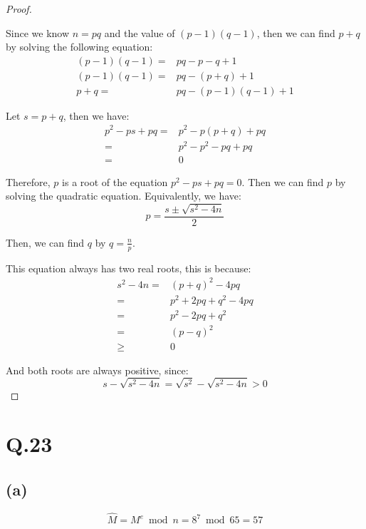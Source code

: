 \documentclass[a4paper,12pt]{article}
\begin{document}
\begin{proof}
$ $

Since we know $n = pq$ and the value of $(p-1)(q-1)$, then we can find $p+q$ by solving the following equation:
\begin{align*}
	(p-1)(q-1) =& pq - p - q + 1 \\
	(p-1)(q-1) =& pq - (p + q) + 1 \\
	p + q =& pq - (p-1)(q-1) + 1 
\end{align*}

Let $s = p + q$, then we have:
\begin{align*}
	p^2 -ps + pq =& p^2 - p(p+q) + pq \\
	=& p^2 -p^2 - pq + pq \\
	=& 0
\end{align*}

Therefore, $p$ is a root of the equation $p^2 - ps + pq = 0$.
Then we can find $p$ by solving the quadratic equation.
Equivalently, we have:
\begin{equation*}
	p = \frac{s \pm \sqrt{s^2 - 4n}}{2}
\end{equation*}

Then, we can find $q$ by $q = \frac{n}{p}$.

This equation always has two real roots, this is because:
\begin{align*}
	s^2 - 4n =& (p + q)^2 - 4pq \\
	=& p^2 + 2pq + q^2 - 4pq \\
	=& p^2 - 2pq + q^2 \\
	=& (p - q)^2 \\
	\geq& 0
\end{align*}

And both roots are always positive, since:
\begin{equation*}
	s - \sqrt{s^2 - 4n} = \sqrt{s^2} - \sqrt{s^2 - 4n} > 0
\end{equation*}
\end{proof}

\section*{Q.23}

\subsection*{(a)}

\begin{equation*}
	\hat{M} = M^e \bmod n = 8^7 \bmod 65 = 57
\end{equation*}
\end{document}
